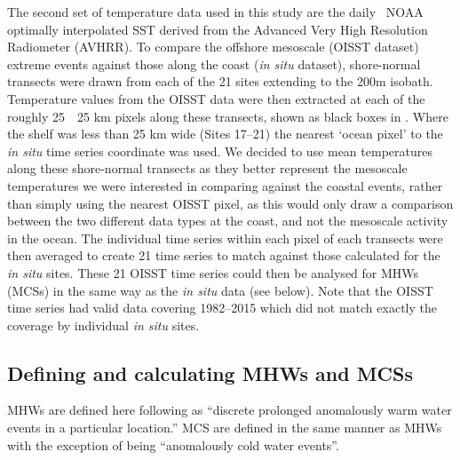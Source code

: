 \documentclass[a4paper,10pt,review]{elsarticle}
\begin{document}
The second set of temperature data used in this study are the daily \degree~NOAA optimally interpolated SST \citep[OISST;][]{Reynolds2007} derived from the Advanced Very High Resolution Radiometer (AVHRR). To compare the offshore mesoscale (OISST dataset) extreme events against those along the coast (\emph{in situ} dataset), shore-normal transects were drawn from each of the 21 sites extending to the 200m isobath. Temperature values from the OISST data were then extracted at each of the roughly 25~\texttimes~25 km pixels along these transects, shown as black boxes in . Where the shelf was less than 25 km wide (Sites 17--21) the nearest `ocean pixel' to the \emph{in situ} time series coordinate was used. We decided to use mean temperatures along these shore-normal transects as they better represent the mesoscale temperatures we were interested in comparing against the coastal events, rather than simply using the nearest OISST pixel, as this would only draw a comparison between the two different data types at the coast, and not the mesoscale activity in the ocean. The individual time series within each pixel of each transects were then averaged to create 21 time series to match against those calculated for the \emph{in situ} sites. These 21 OISST time series could then be analysed for MHWs (MCSs) in the same way as the \emph{in situ} data (see below). Note that the OISST time series had valid data covering 1982--2015 which did not match exactly the coverage by individual \emph{in situ} sites.

\subsection{Defining and calculating MHWs and MCSs}
MHWs are defined here following \citet{Hobday2016} as ``discrete prolonged anomalously warm water events in a particular location.'' MCS are defined in the same manner as MHWs with the exception of being ``anomalously cold water events''.
\end{document}
